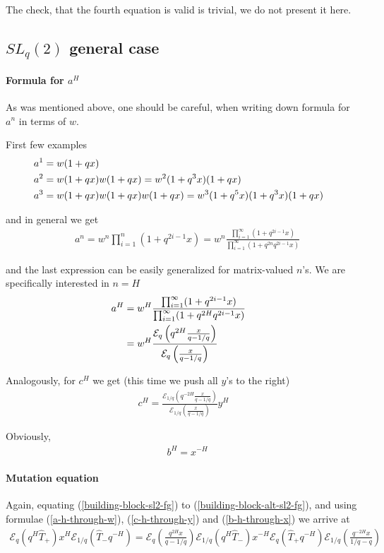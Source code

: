 \documentclass{article}
\newcommand{\lb}{\left (}
\newcommand{\rb}{\right )}
\newcommand {\?}{\textit{???}}
\newcommand{\me}[0]{\mathcal{E}}
\newcommand{\hT}[0]{\hat{T}}
\newcommand{\delabel}[1]{(\ref{#1})}
\begin{document}
The check, that the fourth equation is valid is trivial, we do not present it here.

\subsection{$SL_q(2)$ general case}
\paragraph{Formula for $a^H$}
As was mentioned above, one should be careful, when writing down formula for $a^n$ in terms of $w$.

First few examples
\begin{align}
& a^1 = w(1 + q x) & \\ \notag
& a^2 = w(1 + q x) w (1 + q x) = w^2 (1 + q^3 x) (1 + q x) & \\ \notag
& a^3 = w(1 + q x) w (1 + q x) w (1 + q x) = w^3 (1 + q^5 x) (1 + q^3 x) (1 + q x) &
\end{align}

and in general we get
\begin{align}
& a^n = w^n \prod_{i = 1}^n (1 + q^{2 i - 1} x) = w^n
  \frac{\prod_{i = 1}^\infty (1 + q^{2i -1} x)}{\prod_{i = 1}^\infty (1 + q^{2n} q^{2i -1} x)}
\end{align}

and the last expression can be easily generalized for matrix-valued $n$'s.
We are specifically interested in $n = H$
\begin{align}
\label{a-h-through-w}
a^H & = w^H \frac{\prod_{i = 1}^\infty (1 + q^{2i -1} x)}{\prod_{i = 1}^\infty (1 + q^{2H} q^{2i -1} x)} & \\ \notag
& = w^H \frac{\me_q \lb q^{2H} \frac{x}{q - 1/q} \rb}{\me_q \lb \frac{x}{q - 1/q} \rb}
\end{align}

Analogously, for $c^H$ we get (this time we push all $y$'s to the right)
\begin{align}
\label{c-h-through-y}
c^H = \frac{\me_{1/q} \lb q^{-2H} \frac{x}{q - 1/q} \rb}{\me_{1/q} \lb \frac{x}{q - 1/q} \rb} y^H
\end{align}

Obviously,
\begin{align}
\label{b-h-through-x}
& b^H = x^{-H}
\end{align}

\paragraph{Mutation equation}
Again, equating \delabel{building-block-sl2-fg} to \delabel{building-block-alt-sl2-fg},
and using formulae \delabel{a-h-through-w}, \delabel{c-h-through-y} and \delabel{b-h-through-x}
we arrive at
\begin{align}
\label{mutation-sl2-main-equation}
\me_q(q^H \hT_+) x^H \me_{1/q}(\hT_- q^{-H}) = \me_q\lb \frac{q^{2H} x}{q - 1/q}\rb
\me_{1/q}(q^H \hT_-) x^{-H} \me_{q}(\hT_+ q^{-H}) \me_{1/q}\lb \frac{q^{-2H} x}{1/q - q}\rb
\end{align}
\end{document}
